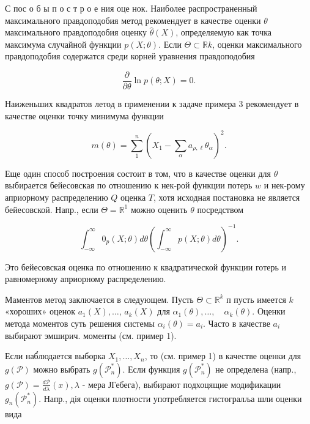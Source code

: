\documentclass[10pt]{article}
\begin{document}
С пос о б ы п о с т р о е ния оце нок. Наиболее распространенный максимального правдоподобия метод рекомендует в качестве оценки $\theta$ максимального правдоподобия оценку $\hat{\theta}(X)$, определяемую как точка максимума случайной функции $p(X ; \theta)$. Если $\Theta \subset \mathbb{R} k$, оценки максимального правдоподобия содержатся среди корнеӥ уравнения правдоподобия



\[

\frac{\partial}{\partial \theta} \ln p(\theta ; X)=0 .

\]



Наиженьших квадратов летод в применении к задаче примера 3 рекомендует в качестве оценки точку минимума функции



\[

m(\theta)=\sum_{1}^{n}\left(X_{1}-\sum_{\alpha} a_{\rho, \ell} \theta_{\alpha}\right)^{2} .

\]



Еще один способ построения состоит в том, что в качестве оценки для $\theta$ выбирается бейесовская по отношению к нек-рой функции потерь $w$ и нек-рому априорному распределению $Q$ оценка $T$, хотя исходная постановка не является бейесовской. Напр., если $\Theta=\mathbb{R}^{1}$ можно оценить $\theta$ посредством



\[

\int_{-\infty}^{\infty} 0_{p}(X ; \theta) d \theta\left(\int_{-\infty}^{\infty} p(X ; \theta) d \theta\right)^{-1} .

\]



Это бейесовская оценка по отношению к квадратической функции готерь и равномерному априорному распределению.



Маментов метод заключается в следующем. Пусть $\Theta \subset \mathbb{R}^{k}$ п пусть имеется $k$ «хороших» оценок $a_{1}(X), \ldots$, $a_{k}(X)$ для $\alpha_{1}(\theta), \ldots, \quad \alpha_{k}(\theta)$. Оценки метода моментов суть решения системы $\alpha_{i}(\theta)=a_{i}$. Часто в качестве $a_{i}$ выбирают эмширич. моменты (см. пример 1).



Если наб́людается выборка $X_{1}, \ldots, X_{n}$, то (см. пример 1) в качестве оценки для $g(\mathscr{P})$ можно выбрать $g\left(\mathscr{P}_{n}^{*}\right)$. Если функция $g\left(\mathscr{P}_{n}^{*}\right)$ не определена (напр., $g(\mathscr{P})=\frac{d \mathscr{P}}{d \lambda}(x), \lambda$ - мера ЈГебега), выбирают подхоцящие модификации $g_{n}\left(\mathscr{P}_{n}^{*}\right)$. Напр., дія оценки плотности употребляется гистогралља шли оценки вида
\end{document}
